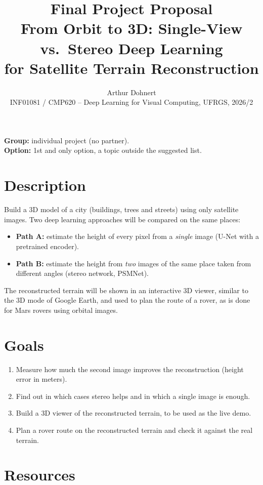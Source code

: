 \documentclass[11pt,a4paper]{article}
\title{Final Project Proposal\\[0.3em]
\large From Orbit to 3D: Single-View vs.\ Stereo Deep Learning\\for Satellite Terrain Reconstruction}
\author{Arthur Dohnert\\
\small INF01081 / CMP620 -- Deep Learning for Visual Computing, UFRGS, 2026/2}
\date{}
\begin{document}
\maketitle

\noindent\textbf{Group:} individual project (no partner).\\
\textbf{Option:} 1st and only option, a topic outside the suggested list.

\section*{Description}

Build a 3D model of a city (buildings, trees and streets) using only satellite images.
Two deep learning approaches will be compared on the same places:
\begin{itemize}
  \item \textbf{Path A:} estimate the height of every pixel from a \emph{single} image (U-Net with a pretrained encoder).
  \item \textbf{Path B:} estimate the height from \emph{two} images of the same place taken from different angles (stereo network, PSMNet).
\end{itemize}
The reconstructed terrain will be shown in an interactive 3D viewer, similar to the 3D mode of Google Earth, and used to plan the route of a rover, as is done for Mars rovers using orbital images.

\section*{Goals}

\begin{enumerate}
  \item Measure how much the second image improves the reconstruction (height error in meters).
  \item Find out in which cases stereo helps and in which a single image is enough.
  \item Build a 3D viewer of the reconstructed terrain, to be used as the live demo.
  \item Plan a rover route on the reconstructed terrain and check it against the real terrain.
\end{enumerate}

\section*{Resources}
\end{document}
